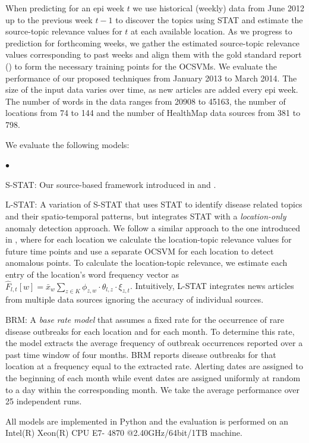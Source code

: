 \documentclass[conference]{IEEEtran}
\newcommand{\squishlist}{
   \begin{list}{$\bullet$}
    {
      \setlength{\itemsep}{0pt}
      \setlength{\parsep}{3pt}
      \setlength{\topsep}{3pt}
      \setlength{\partopsep}{0pt}
      \setlength{\leftmargin}{1.5em}
      \setlength{\labelwidth}{1em}
      \setlength{\labelsep}{0.5em} } }
\newcommand{\squishend}{
    \end{list}  }
\newcommand{\model}{{STAT}\xspace} %
\newcommand{\fullmodel}{{S-STAT}\xspace}
\newcommand{\locationmodel}{{L-STAT}\xspace}
\begin{document}
When predicting for an epi week $t$ we use historical (weekly) data from June 2012 up to the previous week $t-1$ to discover the topics using \model and estimate the source-topic relevance values for $t$ at each available location. As we progress to prediction for forthcoming weeks, we gather the estimated source-topic relevance values corresponding to past weeks and align them with the gold standard report () to  form the necessary training points for the OCSVMs. We evaluate the performance of our proposed techniques from January 2013 to March 2014. The size of the input data varies over time, as new articles are added every epi week. The number of words in the data ranges from 20908 to 45163, the number of locations from 74 to 144 and the number of HealthMap data sources from 381 to 798.

 We evaluate the following models:
\squishlist
\item \fullmodel: Our source-based framework introduced in  and . 
\item \locationmodel: A variation of \fullmodel that uses \model to identify disease related topics and their spatio-temporal patterns, but integrates \model with a {\em location-only} anomaly detection approach. We follow a similar approach to the one introduced in , where for each location we calculate the location-topic relevance values for future time points and use a separate OCSVM for each location to detect anomalous points. To calculate the location-topic relevance, we estimate each entry of the location's word frequency vector as $\hat{F}_{l,t}[w] = \bar{x}_{w} \sum_{z \in K}\phi_{z,w}\cdot \theta_{l,z} \cdot \xi_{z,t}$. Intuitively,  \locationmodel integrates news articles from multiple data sources ignoring the accuracy of individual sources.
\item BRM: A {\em base rate model} that assumes a fixed rate for the occurrence of rare disease outbreaks for each location and for each
month. To determine this rate, the model extracts the average frequency of outbreak occurrences reported over a past time window of four months. BRM reports disease outbreaks for that location at a frequency equal to the extracted rate. Alerting dates are assigned to the beginning of each month while event dates are assigned uniformly at random to a day within the corresponding month. We take the average performance over 25 independent runs.
\squishend
All models are implemented in Python and the evaluation is performed on an Intel(R) Xeon(R) CPU E7- 4870 @2.40GHz/64bit/1TB machine. 
\end{document}
